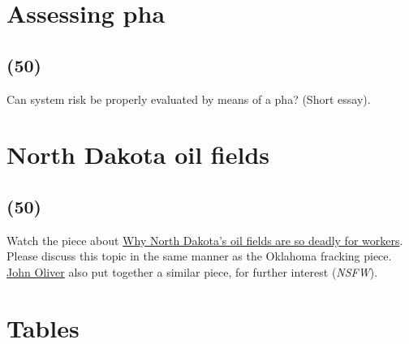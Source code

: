 \documentclass[11pt,a4paper]{article}
\makeatletter
\newcommand{\acs}{\acrshort} %
\renewcommand\listoftables{%
    \@starttoc{lot}%
}
\makeatother
\begin{document}
\newpage
        
\section{Assessing \acs{pha}}
\subsection*{(50)}
Can system risk be properly evaluated by means of a \acs{pha}? (Short essay).
        
        
        
        
        
\newpage

\section{North Dakota oil fields}
\subsection*{(50)}
Watch the piece about \href{http://www.pbs.org/newshour/bb/north-dakotas-oil-fields-deadly-workers/}{Why North Dakota’s oil fields are so deadly for workers}. Please discuss this topic in the same manner as the Oklahoma fracking piece. \href{https://youtu.be/jYusNNldesc}{John Oliver} also put together a similar piece, for further interest (\textit{NSFW}).





\newpage

\section*{Tables}

{%
\let\oldnumberline\numberline%
\renewcommand{\numberline}{\tablename~\oldnumberline}%
\listoftables%
}

\newpage


\end{document}
